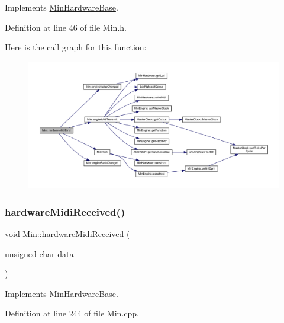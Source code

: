 Implements \hyperlink{class_min_hardware_base_ab65fc29881bb7dea6273c0753ad5d7dd}{Min\+Hardware\+Base}.



Definition at line 46 of file Min.\+h.

Here is the call graph for this function\+:
\nopagebreak
\begin{figure}[H]
\begin{center}
\leavevmode
\includegraphics[width=350pt]{class_min_a854b62697ad910d3bb0536fe7fd3d725_cgraph}
\end{center}
\end{figure}
\mbox{\label{class_min_a8d4ebe4e020e14c2457d42f33c4c9e32}} 
\subsubsection{\texorpdfstring{hardware\+Midi\+Received()}{hardwareMidiReceived()}}
{\footnotesize\ttfamily void Min\+::hardware\+Midi\+Received (\begin{DoxyParamCaption}\item[{unsigned char}]{data }\end{DoxyParamCaption})\hspace{0.3cm}{\ttfamily [virtual]}}



Implements \hyperlink{class_min_hardware_base_a8dc8c84b39b7b80d4a3c7e7fce017f2a}{Min\+Hardware\+Base}.



Definition at line 244 of file Min.\+cpp.

